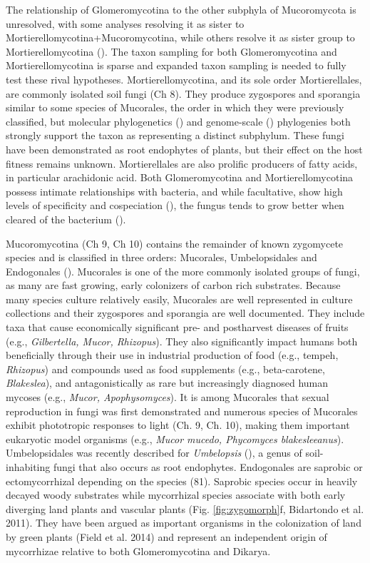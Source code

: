 \documentclass[]{book}
\begin{document}
The relationship of Glomeromycotina to the other subphyla of
Mucoromycota is unresolved, with some analyses resolving it as sister to
Mortierellomycotina+Mucoromycotina, while others resolve it as sister
group to Mortierellomycotina (\citet{Spatafora_2016}). The taxon
sampling for both Glomeromycotina and Mortierellomycotina is sparse and
expanded taxon sampling is needed to fully test these rival hypotheses.
Mortierellomycotina, and its sole order Mortierellales, are commonly
isolated soil fungi (Ch 8). They produce zygospores and sporangia
similar to some species of Mucorales, the order in which they were
previously classified, but molecular phylogenetics
(\citet{Hoffmann_2011}) and genome-scale (\citet{Spatafora_2016})
phylogenies both strongly support the taxon as representing a distinct
subphylum. These fungi have been demonstrated as root endophytes of
plants, but their effect on the host fitness remains unknown.
Mortierellales are also prolific producers of fatty acids, in particular
arachidonic acid. Both Glomeromycotina and Mortierellomycotina possess
intimate relationships with bacteria, and while facultative, show high
levels of specificity and cospeciation (\citet{Bonfante_2017}), the
fungus tends to grow better when cleared of the bacterium
(\citet{Uehling_2017}).

Mucoromycotina (Ch 9, Ch 10) contains the remainder of known zygomycete
species and is classified in three orders: Mucorales, Umbelopsidales and
Endogonales (\citet{Spatafora_2016}). Mucorales is one of the more
commonly isolated groups of fungi, as many are fast growing, early
colonizers of carbon rich substrates. Because many species culture
relatively easily, Mucorales are well represented in culture collections
and their zygospores and sporangia are well documented. They include
taxa that cause economically significant pre- and postharvest diseases
of fruits (e.g., \emph{Gilbertella, Mucor, Rhizopus}). They also
significantly impact humans both beneficially through their use in
industrial production of food (e.g., tempeh, \emph{Rhizopus}) and
compounds used as food supplements (e.g., beta-carotene,
\emph{Blakeslea}), and antagonistically as rare but increasingly
diagnosed human mycoses (e.g., \emph{Mucor, Apophysomyces}). It is among
Mucorales that sexual reproduction in fungi was first demonstrated and
numerous species of Mucorales exhibit phototropic responses to light
(Ch. 9, Ch. 10), making them important eukaryotic model organisms (e.g.,
\emph{Mucor mucedo, Phycomyces blakesleeanus}). Umbelopsidales was
recently described for \emph{Umbelopsis }(\citet{Spatafora_2016}), a
genus of soil-inhabiting fungi that also occurs as root endophytes.
Endogonales are saprobic or ectomycorrhizal depending on the species
(81). Saprobic species occur in heavily decayed woody substrates while
mycorrhizal species associate with both early diverging land plants and
vascular plants (Fig. \ref{fig:zygomorph}f, Bidartondo et al. 2011).
They have been argued as important organisms in the colonization of land
by green plants (Field et al. 2014) and represent an independent origin
of mycorrhizae relative to both Glomeromycotina and Dikarya.
\end{document}
